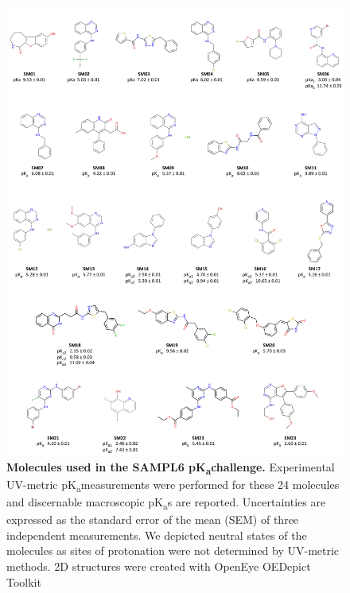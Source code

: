 \documentclass[9pt,lineno]{elife}
\newcommand{\pKa}{pK\textsubscript{a}}
\begin{document}
\begin{figure}
\includegraphics[width=1.00\linewidth]{figures/SAMPL6_pKa_molecules_fig}
\caption{{\bf Molecules used in the SAMPL6 \pKa challenge.} 
Experimental UV-metric \pKa measurements were performed for these 24 molecules and discernable macroscopic \pKa s are reported. 
Uncertainties are expressed as the standard error of the mean (SEM) of three independent measurements. We depicted neutral states of the molecules as sites of protonation were not determined by UV-metric methods.
2D structures were created with OpenEye OEDepict Toolkit~\citep{oedepict_openeye_2017}
}
\label{fig:pKa_molecules}
\end{figure}
\end{document}
